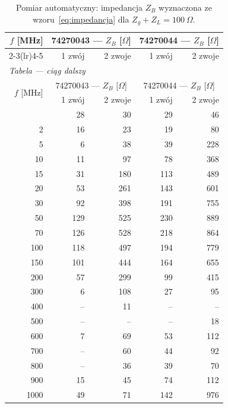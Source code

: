 \documentclass[11pt,a4paper]{article}
\newcommand{\Zsum}{100\ \Omega}
\begin{document}
{\small
\begin{longtable}{rrrrr}
  \caption{Pomiar automatyczny: impedancja $Z_B$ wyznaczona ze wzoru~\eqref{eq:impedancja}
           dla $Z_g+Z_L=\Zsum$.}
  \label{tab:auto-Z}\\
  \toprule
    \multirow{2}{*}{$f$ [MHz]} & \multicolumn{2}{c}{74270043 --- $Z_B$ [$\Omega$]}
    & \multicolumn{2}{c}{74270044 --- $Z_B$ [$\Omega$]} \\
    \cmidrule(lr){2-3}\cmidrule(lr){4-5}
     & 1 zwój & 2 zwoje & 1 zwój & 2 zwoje \\
  \midrule
\endfirsthead
  \multicolumn{5}{l}{\small\textit{Tabela \thetable{} --- ciąg dalszy}}\\
  \toprule
    \multirow{2}{*}{$f$ [MHz]} & \multicolumn{2}{c}{74270043 --- $Z_B$ [$\Omega$]}
    & \multicolumn{2}{c}{74270044 --- $Z_B$ [$\Omega$]} \\
    \cmidrule(lr){2-3}\cmidrule(lr){4-5}
     & 1 zwój & 2 zwoje & 1 zwój & 2 zwoje \\
  \midrule
\endhead
  \bottomrule
\endfoot
    1 & 28 & 30 & 29 & 46 \\
    2 & 16 & 23 & 19 & 80 \\
    5 & 6 & 38 & 39 & 228 \\
    10 & 11 & 97 & 78 & 368 \\
    15 & 31 & 180 & 113 & 489 \\
    20 & 53 & 261 & 143 & 601 \\
    30 & 92 & 398 & 191 & 755 \\
    50 & 129 & 525 & 230 & 889 \\
    70 & 126 & 528 & 218 & 864 \\
    100 & 118 & 497 & 194 & 779 \\
    150 & 101 & 444 & 164 & 655 \\
    200 & 57 & 299 & 99 & 415 \\
    300 & 6 & 108 & 27 & 95 \\
    400 & -- & 11 & -- & -- \\
    500 & -- & -- & -- & 18 \\
    600 & 7 & 69 & 53 & 112 \\
    700 & -- & 60 & 44 & 92 \\
    800 & -- & 36 & 39 & 70 \\
    900 & 15 & 45 & 74 & 112 \\
    1000 & 49 & 71 & 142 & 976 \\
\end{longtable}}
\end{document}
